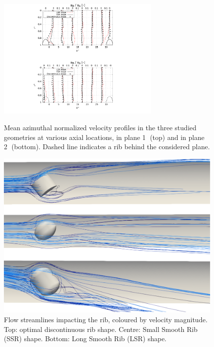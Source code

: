 \begin{figure}[p]

\begin{minipage}[c][11.5cm][t]{1.0\linewidth}
\centering
\includegraphics[width=8cm]{fig/applications/optim/Azimuthal_vel_compare.pdf}
\caption{Mean azimuthal normalized velocity profiles in the three studied geometries at various axial locations, in plane \textcircled{1} (top) and in plane \textcircled{2} (bottom). Dashed line indicates a rib behind the considered plane.}
\label{azimuthal_vel_compare}
\end{minipage}

\begin{minipage}[c][11.5cm][c]{1.0\linewidth}
\centering
\includegraphics[width=0.6\linewidth]{fig/applications/optim/Streamlines_compare.pdf}
\caption{Flow streamlines impacting the rib, coloured by velocity magnitude. Top: optimal discontinuous rib shape. Centre: Small Smooth Rib (SSR) shape. Bottom: Long Smooth Rib (LSR) shape.}
\label{streamlines_compare}
\end{minipage}

\end{figure}



